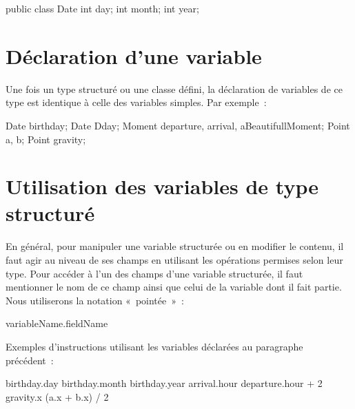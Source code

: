 	\begin{java}
public class Date{
	int day;
	int month;
	int year;
}
	\end{java}


	
	\section{Déclaration d’une variable}
	
		Une fois un type structuré ou une classe défini, 
		la déclaration de variables de ce type 
		est identique à celle des variables simples. 
		Par exemple~:
	
		\begin{pseudocode}
		\end{pseudocode}

		\begin{java}
Date birthday;
Date Dday;
Moment departure, arrival, aBeautifullMoment;
Point a, b;
Point gravity;
		\end{java}
	
	\section{Utilisation des variables de type structuré}
	
		En général, pour manipuler une variable structurée ou en modifier le
		contenu, il faut agir au niveau de ses champs en utilisant les
		opérations permises selon leur type.  Pour accéder à l’un des champs
		d’une variable structurée, il faut mentionner le nom de ce champ ainsi
		que celui de la variable dont il fait partie.  Nous utiliserons la
		notation «~pointée~»~:
	
		\begin{pseudocode}
			\Stmt variableName.fieldName
		\end{pseudocode}
	
		Exemples d’instructions utilisant les variables
		déclarées au paragraphe précédent~:
	
		\begin{pseudocode}
		\Let birthday.day \Gets 15
		\Let birthday.month \Gets 10
		\Let birthday.year \Gets 2014
		\Let arrival.hour \Gets departure.hour + 2
		\Let gravity.x \Gets (a.x + b.x) / 2
		\end{pseudocode}

